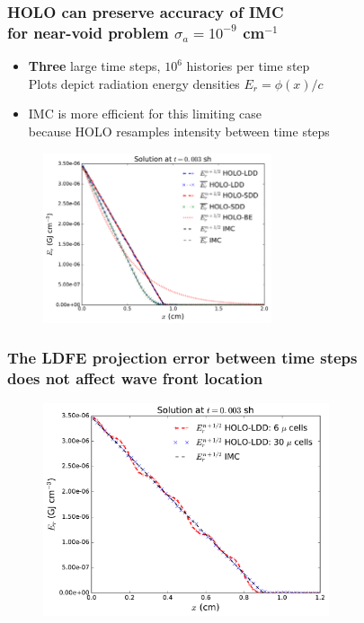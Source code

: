 \documentclass[xcolor=dvipsnames,hyperref={pdfpagelabels=false},unknownkeysallowed]{beamer}
\newcommand{\colG}[1]{{\color{Gray!110} #1}}
\newlength{\wideitemsep}
\let\olditem\item
\renewcommand{\item}{\setlength{\itemsep}{\wideitemsep}\olditem}
\begin{document}
\begin{frame}
    \frametitle{HOLO can preserve accuracy of IMC \\ for near-void problem $\sigma_a=10^{-9}$ cm$^{-1}$}
    \begin{itemize}
    \vspace{0.1in}
        \item[] \textbf{Three} large time steps, $10^6$ histories per time step \\ \colG{Plots depict radiation energy densities $E_r=\phi(x)/c$}
        \item[] IMC is more efficient for this limiting case \\ \colG{because HOLO resamples intensity between time steps}
    \end{itemize}
        \begin{figure}
\centering
    \includegraphics[width=0.6\textwidth]{void_imc_compare.pdf}
\end{figure}
\end{frame}

\begin{frame}
    \frametitle{The LDFE projection error between time steps \\ does not affect wave front location}
\begin{figure}[H]
  \centering
    \includegraphics[width=0.75\textwidth]{void_ang_compare.pdf}
\end{figure}
\end{frame}
\end{document}
